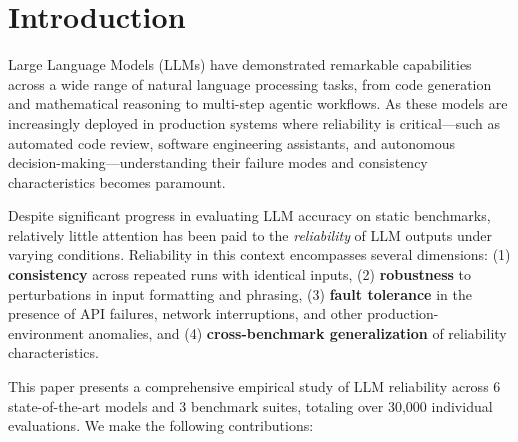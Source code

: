 \section{Introduction}

Large Language Models (LLMs) have demonstrated remarkable capabilities across a wide range of natural language processing tasks, from code generation and mathematical reasoning to multi-step agentic workflows. As these models are increasingly deployed in production systems where reliability is critical---such as automated code review, software engineering assistants, and autonomous decision-making---understanding their failure modes and consistency characteristics becomes paramount.

Despite significant progress in evaluating LLM accuracy on static benchmarks, relatively little attention has been paid to the \emph{reliability} of LLM outputs under varying conditions. Reliability in this context encompasses several dimensions: (1) \textbf{consistency} across repeated runs with identical inputs, (2) \textbf{robustness} to perturbations in input formatting and phrasing, (3) \textbf{fault tolerance} in the presence of API failures, network interruptions, and other production-environment anomalies, and (4) \textbf{cross-benchmark generalization} of reliability characteristics.

This paper presents a comprehensive empirical study of LLM reliability across 6 state-of-the-art models and 3 benchmark suites, totaling over 30,000 individual evaluations. We make the following contributions:

